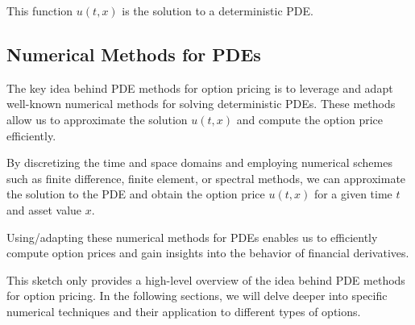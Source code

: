 This function $u(t, x)$ is the solution to a deterministic PDE.

\subsection{Numerical Methods for PDEs}

The key idea behind PDE methods for option pricing is to leverage and adapt well-known numerical methods for solving deterministic PDEs. These methods allow us to approximate the solution $u(t, x)$ and compute the option price efficiently.

By discretizing the time and space domains and employing numerical schemes such as finite difference, finite element, or spectral methods, we can approximate the solution to the PDE and obtain the option price $u(t, x)$ for a given time $t$ and asset value $x$.

Using/adapting these numerical methods for PDEs enables us to efficiently compute option prices and gain insights into the behavior of financial derivatives.

This sketch only provides a high-level overview of the idea behind PDE methods for option pricing. In the following sections, we will delve deeper into specific numerical techniques and their application to different types of options.

